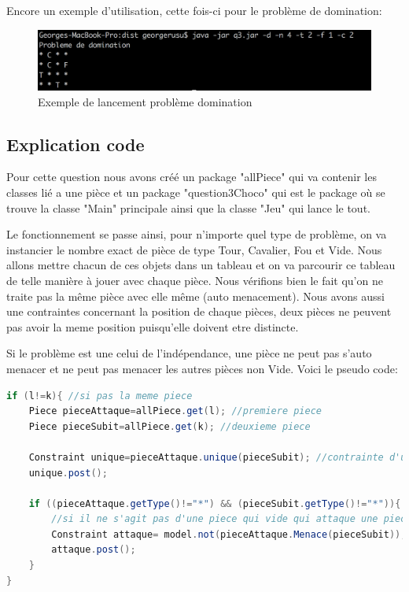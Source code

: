 \documentclass[a4paper,10pt]{article}
\begin{document}
Encore un exemple d'utilisation, cette fois-ci pour le problème de domination:
\begin{figure}[!h]
  \includegraphics[width=\linewidth]{img/q31.png}
  \caption{Exemple de lancement problème domination}
\end{figure}
\subsection{Explication code}
\par Pour cette question nous avons créé un package "allPiece" qui va contenir les classes lié a une pièce et un package "question3Choco" qui est le package où se trouve la classe "Main" principale ainsi que la classe "Jeu" qui lance le tout. 

\par Le fonctionnement se passe ainsi, pour n'importe quel type de problème, on va instancier le nombre exact de pièce de type Tour, Cavalier, Fou et Vide. Nous allons mettre chacun de ces objets dans un tableau et on va parcourir ce tableau de telle manière à jouer avec chaque pièce. Nous vérifions bien le fait qu'on ne traite pas la même pièce avec elle même (auto menacement). Nous avons aussi une contraintes concernant la position de chaque pièces, deux pièces ne peuvent pas avoir la meme position puisqu'elle doivent etre distincte.
\par Si le problème est une celui de l'indépendance, une pièce ne peut pas s'auto menacer et ne peut pas menacer les autres pièces non Vide. Voici le pseudo code:
\begin{lstlisting}[language=Java,basicstyle=\tiny]
if (l!=k){ //si pas la meme piece
	Piece pieceAttaque=allPiece.get(l); //premiere piece
	Piece pieceSubit=allPiece.get(k); //deuxieme piece
					
	Constraint unique=pieceAttaque.unique(pieceSubit); //contrainte d'unicite
	unique.post();
					
	if ((pieceAttaque.getType()!="*") && (pieceSubit.getType()!="*")){
		//si il ne s'agit pas d'une piece qui vide qui attaque une piece vide
		Constraint attaque= model.not(pieceAttaque.Menace(pieceSubit));
		attaque.post();	
	}
}
\end{lstlisting}
\end{document}
